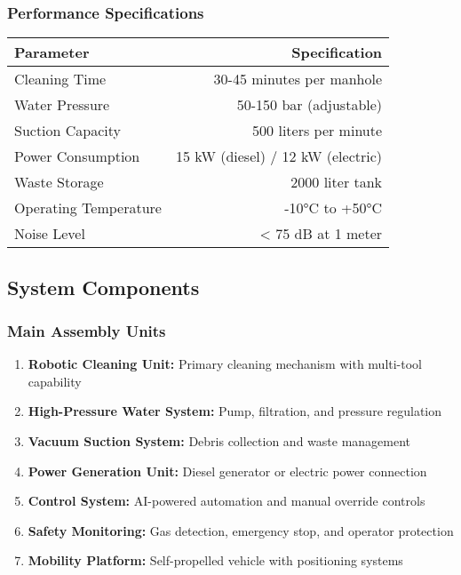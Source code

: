 \documentclass[11pt,a4paper]{article}
\begin{document}
\subsubsection{Performance Specifications}
\begin{center}
\begin{tabular}{lr}
\toprule
\textbf{Parameter} & \textbf{Specification} \\
\midrule
Cleaning Time & 30-45 minutes per manhole \\
Water Pressure & 50-150 bar (adjustable) \\
Suction Capacity & 500 liters per minute \\
Power Consumption & 15 kW (diesel) / 12 kW (electric) \\
Waste Storage & 2000 liter tank \\
Operating Temperature & -10°C to +50°C \\
Noise Level & < 75 dB at 1 meter \\
\bottomrule
\end{tabular}
\end{center}

\subsection{System Components}

\subsubsection{Main Assembly Units}
\begin{enumerate}[leftmargin=2em]
    \item \textbf{Robotic Cleaning Unit:} Primary cleaning mechanism with multi-tool capability
    \item \textbf{High-Pressure Water System:} Pump, filtration, and pressure regulation
    \item \textbf{Vacuum Suction System:} Debris collection and waste management
    \item \textbf{Power Generation Unit:} Diesel generator or electric power connection
    \item \textbf{Control System:} AI-powered automation and manual override controls
    \item \textbf{Safety Monitoring:} Gas detection, emergency stop, and operator protection
    \item \textbf{Mobility Platform:} Self-propelled vehicle with positioning systems
\end{enumerate}
\end{document}
